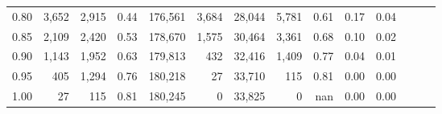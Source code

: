 \begin{tabular}{rrrrrrrrrrrrrr}
0.80 &   3,652 &  2,915 &  0.44 &  176,561 &    3,684 &  28,044 &   5,781 &  0.61 &  0.17 &      0.04 \\
0.85 &   2,109 &  2,420 &  0.53 &  178,670 &    1,575 &  30,464 &   3,361 &  0.68 &  0.10 &      0.02 \\
0.90 &   1,143 &  1,952 &  0.63 &  179,813 &      432 &  32,416 &   1,409 &  0.77 &  0.04 &      0.01 \\
0.95 &     405 &  1,294 &  0.76 &  180,218 &       27 &  33,710 &     115 &  0.81 &  0.00 &      0.00 \\
1.00 &      27 &    115 &  0.81 &  180,245 &        0 &  33,825 &       0 &   nan &  0.00 &      0.00 \\
\bottomrule
\end{tabular}
